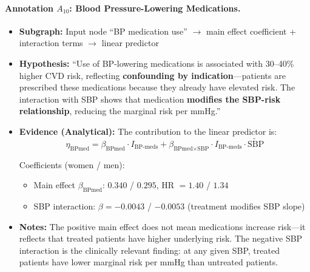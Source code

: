 \documentclass{article}
\begin{document}
\paragraph{Annotation $A_{10}$: Blood Pressure-Lowering Medications.}
\begin{itemize}
    \item \textbf{Subgraph:} Input node ``BP medication use'' $\rightarrow$ main effect coefficient + interaction terms $\rightarrow$ linear predictor
    \item \textbf{Hypothesis:} ``Use of BP-lowering medications is associated with 30--40\% higher CVD risk, reflecting \textbf{confounding by indication}---patients are prescribed these medications because they already have elevated risk. The interaction with SBP shows that medication \textbf{modifies the SBP-risk relationship}, reducing the marginal risk per mmHg.''
    \item \textbf{Evidence (Analytical):} The contribution to the linear predictor is:
    \[  
    \eta_{\text{BPmed}} = \beta_{\text{BPmed}} \cdot I_{\text{BP-meds}} + \beta_{\text{BPmed} \times \text{SBP}} \cdot I_{\text{BP-meds}} \cdot \widetilde{\text{SBP}}
    \]
    
    Coefficients (women / men):
    \begin{itemize}
        \item Main effect $\beta_{\text{BPmed}}$: $0.340$ / $0.295$, HR $= 1.40$ / $1.34$
        \item SBP interaction: $\beta = -0.0043$ / $-0.0053$ (treatment modifies SBP slope)
    \end{itemize}
    \item \textbf{Notes:} The positive main effect does not mean medications increase risk---it reflects that treated patients have higher underlying risk. The negative SBP interaction is the clinically relevant finding: at any given SBP, treated patients have lower marginal risk per mmHg than untreated patients.
\end{itemize}
\end{document}
